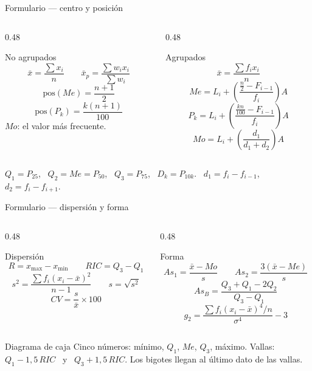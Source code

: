 \documentclass[aspectratio=169,10pt]{beamer}
\begin{document}
\begin{frame}{Formulario — centro y posición}
  \scriptsize
  \begin{columns}[T,onlytextwidth]
    \begin{column}{0.48\textwidth}
      \begin{block}{No agrupados}
        \scriptsize
        \[ \bar{x} = \frac{\sum x_i}{n} \qquad
           \bar{x}_p = \frac{\sum w_i x_i}{\sum w_i} \]
        \[ \text{pos}(Me) = \frac{n+1}{2} \]
        \[ \text{pos}(P_k) = \frac{k(n+1)}{100} \]
        $Mo$: el valor más frecuente.
      \end{block}
    \end{column}
    \begin{column}{0.48\textwidth}
      \begin{block}{Agrupados}
        \scriptsize
        \[ \bar{x} = \frac{\sum f_i x_i}{n} \]
        \[ Me = L_i + \left(\frac{\frac{n}{2}-F_{i-1}}{f_i}\right)A \]
        \[ P_k = L_i + \left(\frac{\frac{kn}{100}-F_{i-1}}{f_i}\right)A \]
        \[ Mo = L_i + \left(\frac{d_1}{d_1+d_2}\right)A \]
      \end{block}
    \end{column}
  \end{columns}

  \vspace{0.05cm}
  {\tiny\color{uniGris} $Q_1 = P_{25}$, \ $Q_2 = Me = P_{50}$, \
  $Q_3 = P_{75}$, \ $D_k = P_{10k}$. \ $d_1 = f_i - f_{i-1}$, \
  $d_2 = f_i - f_{i+1}$.}
\end{frame}

\begin{frame}{Formulario — dispersión y forma}
  \scriptsize
  \begin{columns}[T,onlytextwidth]
    \begin{column}{0.48\textwidth}
      \begin{block}{Dispersión}
        \scriptsize
        \[ R = x_{\max}-x_{\min} \qquad RIC = Q_3-Q_1 \]
        \[ s^2 = \frac{\sum f_i(x_i-\bar{x})^2}{n-1} \qquad s=\sqrt{s^2} \]
        \[ CV = \frac{s}{\bar{x}}\times 100 \]
      \end{block}
    \end{column}
    \begin{column}{0.48\textwidth}
      \begin{block}{Forma}
        \scriptsize
        \[ As_1 = \frac{\bar{x}-Mo}{s} \qquad
           As_2 = \frac{3(\bar{x}-Me)}{s} \]
        \[ As_B = \frac{Q_3+Q_1-2Q_2}{Q_3-Q_1} \]
        \[ g_2 = \frac{\sum f_i(x_i-\bar{x})^4/n}{\sigma^4}-3 \]
      \end{block}
    \end{column}
  \end{columns}

  \vspace{0.05cm}
  \begin{alertblock}{Diagrama de caja}
    \tiny
    Cinco números: mínimo, $Q_1$, $Me$, $Q_3$, máximo. \quad
    Vallas: $Q_1 - 1{,}5\,RIC$ \ y \ $Q_3 + 1{,}5\,RIC$. \quad
    Los bigotes llegan al último dato \destacar{dentro} de las vallas.
  \end{alertblock}
\end{frame}
\end{document}
